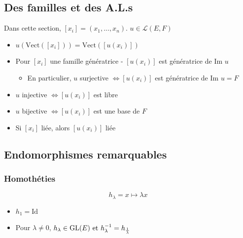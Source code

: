 \documentclass[openany]{book}
\begin{document}
\subsection{Des familles et des A.L.s}
Dans cette section, $[x_i] = (x_1,...,x_n)$. $u \in \mathcal{L}(E, F)$
\begin{itemize}
    \item $u(\text{Vect}([x_i])) = \text{Vect}([u(x_i)])$
    \item Pour $[x_i]$ une famille génératrice - $ [u(x_i)] $ est génératrice de $\text{Im } u$
    \begin{itemize}
        \item En particulier, $u$ surjective $ \iff [u(x_i)] $ est génératrice de $\text{Im } u = F$
    \end{itemize}
    \item $u$ injective $ \iff [u(x_i)] $ est libre
    \item $u$ bijective $ \iff [u(x_i)] $ est une base de $F$
    \item Si $ [x_i] $ liée, alors $ [u(x_i)] $ liée
\end{itemize}

\subsection{Endomorphismes remarquables}
\subsubsection{Homothéties}
\[ h_\lambda = x \mapsto \lambda x \]
\begin{itemize}
    \item $ h_1 = \text{Id} $
    \item Pour $ \lambda \neq 0 $, $ h_\lambda \in \text{GL}(E) \text{ et } h_\lambda^{-1} = h_{\frac{1}{\lambda}} $
\end{itemize}
\end{document}
